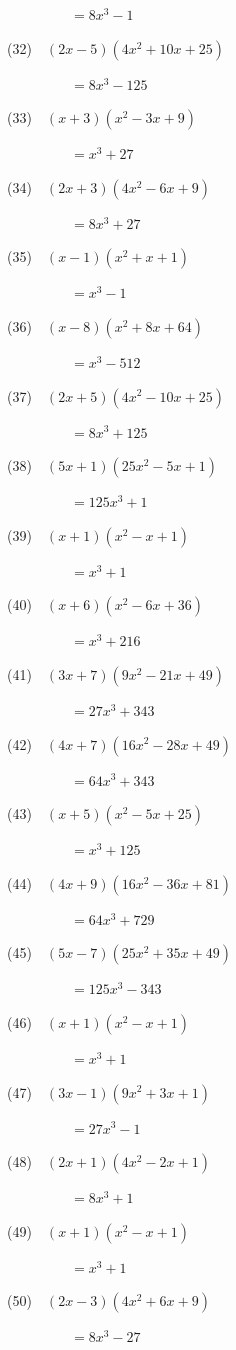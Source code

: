 \documentclass[a4j,twocolumn,10pt,fleqn]{jarticle}
\begin{document}
~~~~~~~~~$=8 x^{3} - 1$

(32)~~$\left(2 x - 5\right) \left(4 x^{2} + 10 x + 25\right)$

~~~~~~~~~$=8 x^{3} - 125$

(33)~~$\left(x + 3\right) \left(x^{2} - 3 x + 9\right)$

~~~~~~~~~$=x^{3} + 27$

(34)~~$\left(2 x + 3\right) \left(4 x^{2} - 6 x + 9\right)$

~~~~~~~~~$=8 x^{3} + 27$

(35)~~$\left(x - 1\right) \left(x^{2} + x + 1\right)$

~~~~~~~~~$=x^{3} - 1$

(36)~~$\left(x - 8\right) \left(x^{2} + 8 x + 64\right)$

~~~~~~~~~$=x^{3} - 512$

(37)~~$\left(2 x + 5\right) \left(4 x^{2} - 10 x + 25\right)$

~~~~~~~~~$=8 x^{3} + 125$

(38)~~$\left(5 x + 1\right) \left(25 x^{2} - 5 x + 1\right)$

~~~~~~~~~$=125 x^{3} + 1$

(39)~~$\left(x + 1\right) \left(x^{2} - x + 1\right)$

~~~~~~~~~$=x^{3} + 1$

(40)~~$\left(x + 6\right) \left(x^{2} - 6 x + 36\right)$

~~~~~~~~~$=x^{3} + 216$

(41)~~$\left(3 x + 7\right) \left(9 x^{2} - 21 x + 49\right)$

~~~~~~~~~$=27 x^{3} + 343$

(42)~~$\left(4 x + 7\right) \left(16 x^{2} - 28 x + 49\right)$

~~~~~~~~~$=64 x^{3} + 343$

(43)~~$\left(x + 5\right) \left(x^{2} - 5 x + 25\right)$

~~~~~~~~~$=x^{3} + 125$

(44)~~$\left(4 x + 9\right) \left(16 x^{2} - 36 x + 81\right)$

~~~~~~~~~$=64 x^{3} + 729$

(45)~~$\left(5 x - 7\right) \left(25 x^{2} + 35 x + 49\right)$

~~~~~~~~~$=125 x^{3} - 343$

(46)~~$\left(x + 1\right) \left(x^{2} - x + 1\right)$

~~~~~~~~~$=x^{3} + 1$

(47)~~$\left(3 x - 1\right) \left(9 x^{2} + 3 x + 1\right)$

~~~~~~~~~$=27 x^{3} - 1$

(48)~~$\left(2 x + 1\right) \left(4 x^{2} - 2 x + 1\right)$

~~~~~~~~~$=8 x^{3} + 1$

(49)~~$\left(x + 1\right) \left(x^{2} - x + 1\right)$

~~~~~~~~~$=x^{3} + 1$

(50)~~$\left(2 x - 3\right) \left(4 x^{2} + 6 x + 9\right)$

~~~~~~~~~$=8 x^{3} - 27$
\end{document}

